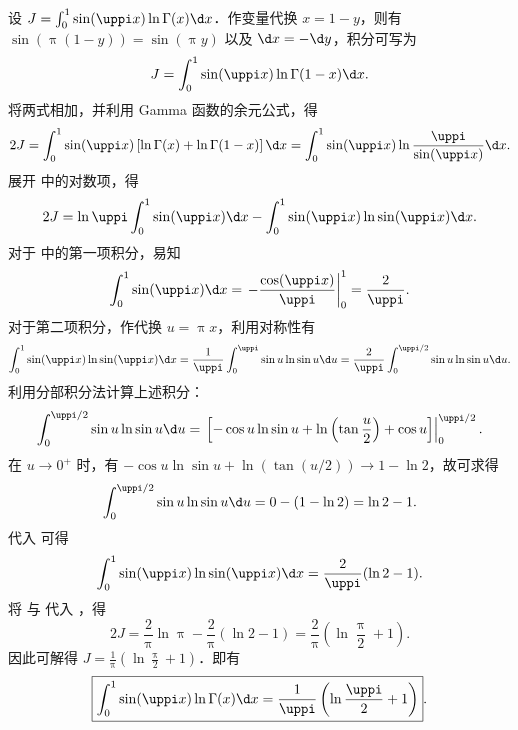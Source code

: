 \begin{myproof}
    设 $J = \int_0^1 \sin(\uppi x) \ln \Gamma(x) \d x$．作变量代换 $x = 1 - y$，则有 $\sin(\uppi(1 - y)) = \sin(\uppi y)$ 以及 $\d x = -\d y$，积分可写为
    \begin{equation}\label{eq:q12-sub}
        J = \int_0^1 \sin(\uppi x) \ln \Gamma(1 - x) \d x.
    \end{equation}
    将两式相加，并利用 Gamma 函数的余元公式，得
    \begin{equation}\label{eq:q12-add}
        2J = \int_0^1 \sin(\uppi x) \left[ \ln \Gamma(x) + \ln \Gamma(1 - x) \right] \d x = \int_0^1 \sin(\uppi x) \ln \frac{\uppi}{\sin(\uppi x)} \d x.
    \end{equation}
    展开  中的对数项，得
    \begin{equation}\label{eq:q12-split}
        2J = \ln \uppi \int_0^1 \sin(\uppi x) \d x - \int_0^1 \sin(\uppi x) \ln \sin(\uppi x) \d x.
    \end{equation}
    对于  中的第一项积分，易知
    \begin{equation}\label{eq:q12-int1}
        \int_0^1 \sin(\uppi x) \d x = \left. -\frac{\cos(\uppi x)}{\uppi} \right|_0^1 = \frac{2}{\uppi}.
    \end{equation}
    对于第二项积分，作代换 $u = \uppi x$，利用对称性有
    \begin{equation}\label{eq:q12-int2-symm}
        \int_0^1 \sin(\uppi x) \ln \sin(\uppi x) \d x = \frac{1}{\uppi} \int_0^{\uppi} \sin u \ln \sin u \d u = \frac{2}{\uppi} \int_0^{\uppi/2} \sin u \ln \sin u \d u.
    \end{equation}
    利用分部积分法计算上述积分：
    \begin{equation}\label{eq:q12-parts}
        \int_0^{\uppi/2} \sin u \ln \sin u \d u = \left. \left[ -\cos u \ln \sin u + \ln\left(\tan \frac{u}{2}\right) + \cos u \right] \right|_0^{\uppi/2}.
    \end{equation}
    在 $u \to 0^+$ 时，有 $-\cos u \ln \sin u + \ln(\tan(u/2)) \to 1 - \ln 2$，故可求得
    \begin{equation}\label{eq:q12-parts-val}
        \int_0^{\uppi/2} \sin u \ln \sin u \d u = 0 - (1 - \ln 2) = \ln 2 - 1.
    \end{equation}
    代入  可得
    \begin{equation}\label{eq:q12-int2-final}
        \int_0^1 \sin(\uppi x) \ln \sin(\uppi x) \d x = \frac{2}{\uppi} (\ln 2 - 1).
    \end{equation}
    将  与  代入 ，得
    \begin{equation}\label{eq:q12-double-J}
        2J = \frac{2}{\uppi} \ln \uppi - \frac{2}{\uppi} (\ln 2 - 1) = \frac{2}{\uppi} \left( \ln \frac{\uppi}{2} + 1 \right).
    \end{equation}
    因此可解得 $J = \frac{1}{\uppi} \left( \ln \frac{\uppi}{2} + 1 \right)$．即有
    \begin{equation}\label{eq:q12-final}
        \boxed{\int_0^1 \sin(\uppi x) \ln \Gamma(x) \d x = \frac{1}{\uppi} \left( \ln \frac{\uppi}{2} + 1 \right)}.
    \end{equation}
\end{myproof}

